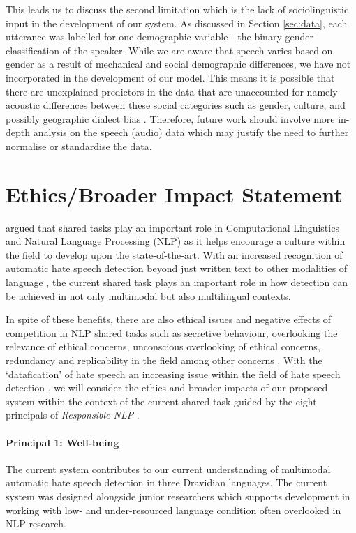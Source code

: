 \documentclass[11pt]{article}
\begin{document}
    This leads us to discuss the second limitation which is the lack of sociolinguistic input in the development of our system. As discussed in Section \ref{sec:data}, each utterance was labelled for one demographic variable - the binary gender classification of the speaker. While we are aware that speech varies based on gender as a result of mechanical and social demographic differences, we have not incorporated in the development of our model. This means it is possible that there are unexplained predictors in the data that are unaccounted for namely acoustic differences between these social categories such as gender, culture, and possibly geographic dialect bias \citep{wong_sociocultural_2024}. Therefore, future work should involve more in-depth analysis on the speech (audio) data which may justify the need to further normalise or standardise the data.
    
\section{Ethics/Broader Impact Statement}
\label{sec:ethic_statement}

    \citet{parra_escartin_ethical_2017} argued that shared tasks play an important role in Computational Linguistics and Natural Language Processing (NLP) as it helps encourage a culture within the field to develop upon the state-of-the-art. With an increased recognition of automatic hate speech detection beyond just written text to other modalities of language \cite{chhabra_literature_2023}, the current shared task plays an important role in how detection can be achieved in not only multimodal but also multilingual contexts.

    In spite of these benefits, there are also ethical issues and negative effects of competition in NLP shared tasks such as secretive behaviour, overlooking the relevance of ethical concerns, unconscious overlooking of ethical concerns, redundancy and replicability in the field among other concerns \cite{parra_escartin_ethical_2017}. With the `datafication' of hate speech an increasing issue within the field of hate speech detection \cite{laaksonen_datafication_2020}, we will consider the ethics and broader impacts of our proposed system within the context of the current shared task guided by the eight principals of \textit{Responsible NLP} \cite{behera_responsible_2023}.

    \paragraph{Principal 1: Well-being} The current system contributes to our current understanding of multimodal automatic hate speech detection in three Dravidian languages. The current system was designed alongside junior researchers which supports development in working with low- and under-resourced language condition often overlooked in NLP research.
\end{document}
